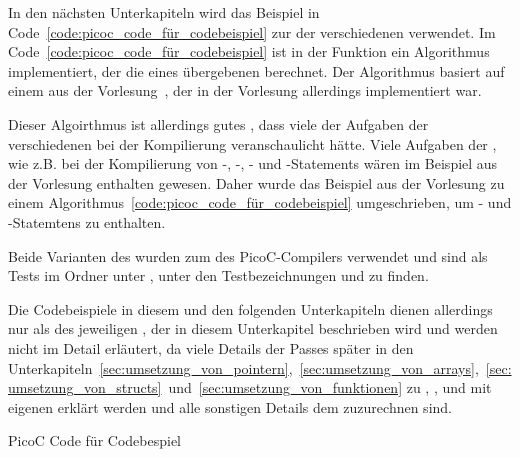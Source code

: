 
In den nächsten Unterkapiteln wird das Beispiel in Code~\ref{code:picoc_code_für_codebeispiel} zur  der verschiedenen  verwendet. Im Code~\ref{code:picoc_code_für_codebeispiel} ist in der Funktion  ein  Algorithmus implementiert, der die  eines übergebenen  berechnet. Der Algorithmus basiert auf einem  aus der Vorlesung~\cite{scholl_betriebssysteme_2020}, der in der Vorlesung allerdings  implementiert war.

Dieser  Algoirthmus ist allerdings  gutes , dass viele der Aufgaben der verschiedenen  bei der Kompilierung veranschaulicht hätte. Viele Aufgaben der , wie z.B. bei der Kompilierung von -, -, - und -Statements wären im Beispiel aus der Vorlesung  enthalten gewesen. Daher wurde das Beispiel aus der Vorlesung zu einem  Algorithmus~\ref{code:picoc_code_für_codebeispiel} umgeschrieben, um - und -Statemtens zu enthalten.

Beide Varianten des  wurden zum  des PicoC-Compilers verwendet und sind als Tests im Ordner  unter , unter den Testbezeichnungen  und  zu finden.

Die Codebeispiele in diesem und den folgenden Unterkapiteln dienen allerdings nur als  des jeweiligen , der in diesem Unterkapitel beschrieben wird und werden nicht im Detail erläutert, da viele Details der Passes später in den Unterkapiteln~\ref{sec:umsetzung_von_pointern},~\ref{sec:umsetzung_von_arrays},~\ref{sec:umsetzung_von_structs}~und~\ref{sec:umsetzung_von_funktionen} zu ,  ,  und  mit eigenen  erklärt werden und alle sonstigen Details dem  zuzurechnen sind.

\begin{code}
  \centering
  \caption{PicoC Code für Codebespiel}
  \label{code:picoc_code_für_codebeispiel}
\end{code}

